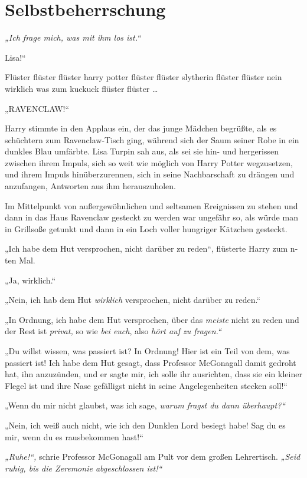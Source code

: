 \chapter{Selbstbeherrschung}

\emph{„Ich frage mich, was mit ihm los ist.“}

\later

 Lisa!“

Flüster flüster flüster harry potter flüster flüster slytherin flüster flüster nein wirklich was zum kuckuck flüster flüster …

„RAVENCLAW!“

Harry stimmte in den Applaus ein, der das junge Mädchen begrüßte, als es schüchtern zum Ravenclaw-Tisch ging, während sich der Saum seiner Robe in ein dunkles Blau umfärbte. Lisa Turpin sah aus, als sei sie hin- und hergerissen zwischen ihrem Impuls, sich so weit wie möglich von Harry Potter wegzusetzen, und ihrem Impuls hinüberzurennen, sich in seine Nachbarschaft zu drängen und anzufangen, Antworten aus ihm herauszuholen.

Im Mittelpunkt von außergewöhnlichen und seltsamen Ereignissen zu stehen und dann in das Haus Ravenclaw gesteckt zu werden war ungefähr so, als würde man in Grillsoße getunkt und dann in ein Loch voller hungriger Kätzchen gesteckt.

„Ich habe dem Hut versprochen, nicht darüber zu reden“, flüsterte Harry zum n-ten Mal.

„Ja, wirklich.“

„Nein, ich hab dem Hut \emph{wirklich} versprochen, nicht darüber zu reden.“

„In Ordnung, ich habe dem Hut versprochen, über das \emph{meiste} nicht zu reden und der Rest ist \emph{privat,} so wie \emph{ bei euch}, also \emph{hört auf zu fragen.“}

„Du willst wissen, was passiert ist? In Ordnung! Hier ist ein Teil von dem, was passiert ist! Ich habe dem Hut gesagt, dass Professor McGonagall damit gedroht hat, ihn anzuzünden, und er sagte mir, ich solle ihr ausrichten, dass sie ein kleiner Flegel ist und ihre Nase gefälligst nicht in seine Angelegenheiten stecken soll!“

„Wenn du mir nicht glaubst, was ich sage, \emph{warum fragst du dann überhaupt?“}

„Nein, ich weiß auch nicht, wie ich den Dunklen Lord besiegt habe! Sag du es mir, wenn du es rausbekommen hast!“

\emph{„Ruhe!“,} schrie Professor McGonagall am Pult vor dem großen Lehrertisch. \emph{„Seid ruhig, bis die Zeremonie abgeschlossen ist!“}


